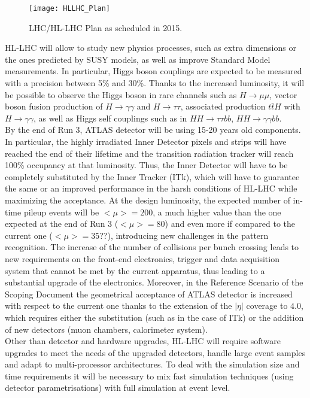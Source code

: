 \documentclass[a4paper,twoside,12pt]{article}
\begin{document}
\begin{figure} [h]
	\texttt{[image: HLLHC\_Plan]}
	\caption{LHC/HL-LHC Plan as scheduled in 2015\cite{scoping}.}
	\label{fig:HLLHC_Plan}
\end{figure}

HL-LHC will allow to study new physics processes, such as extra dimensions or the ones predicted by SUSY models, as well as improve Standard Model measurements. In particular, Higgs boson 
couplings are expected to be measured with a precision between 5\% and 30\%\cite{loi}. Thanks to the increased luminosity, it will be possible to observe the Higgs boson in rare
channels such as  $H \rightarrow \mu\mu$, vector boson 
fusion production of $H \rightarrow \gamma\gamma$ and $H \rightarrow \tau\tau$, associated production $t\bar{t}H$ with $H \rightarrow \gamma\gamma$, as well as Higgs self couplings
such as in $HH \rightarrow \tau\tau b b$, $HH \rightarrow \gamma\gamma b b$.\\

By the end of Run 3, ATLAS detector will be using 15-20 years old components. In particular,
the highly irradiated Inner Detector pixels and strips will have reached the end of their
lifetime and the transition radiation tracker will reach 100\% occupancy at that luminosity. Thus, the Inner Detector will have to be completely substituted by the Inner Tracker (ITk), which will
have to guarantee the same or an improved performance in the harsh conditions of HL-LHC while maximizing the acceptance. At the design luminosity, the expected number of in-time pileup events will be $<\mu > = 200$, a much
higher value than the one expected at the end of Run 3 ($<\mu > = 80$) and even more if 
compared to the current one ($<\mu > = 35$??), introducing new challenges in the pattern
recognition. The increase of the number
of collisions per bunch crossing leads to new requirements on the front-end electronics, trigger and data acquisition system that cannot be met by the current apparatus, thus leading to a 
substantial upgrade of the electronics. Moreover, in the Reference Scenario of the Scoping Document\cite{scoping} the geometrical acceptance of ATLAS detector is increased with respect to 
the current one thanks to the extension of the $|\eta|$ coverage to $4.0$, which requires either the substitution (such as in the case of ITk) or the addition of new detectors (muon chambers,
calorimeter system). \\

Other than detector and hardware upgrades, HL-LHC will require software upgrades to meet the needs of the upgraded detectors, handle large event samples and adapt to multi-processor
architectures. To deal with the simulation size and time requirements it will be necessary to mix fast simulation techniques (using detector parametrisations) with full simulation at event level.
\end{document}
